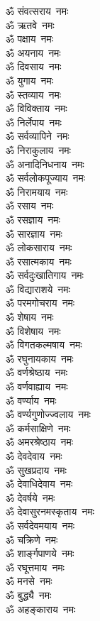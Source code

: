 \begin{multicols}{2}
\begin{flushleft}
ॐ संवत्सराय~नमः\\
ॐ ऋतवे~नमः\\
ॐ पक्षाय~नमः\\
ॐ अयनाय~नमः\\
ॐ दिवसाय~नमः\\
ॐ युगाय~नमः\\
ॐ स्तव्याय~नमः\\
ॐ विविक्ताय~नमः\\
ॐ निर्लेपाय~नमः\hfill{}\\
ॐ सर्वव्यापिने~नमः\\
ॐ निराकुलाय~नमः\\
ॐ अनादिनिधनाय~नमः\\
ॐ सर्वलोकपूज्याय~नमः\\
ॐ निरामयाय~नमः\\
ॐ रसाय~नमः\\
ॐ रसज्ञाय~नमः\\
ॐ सारज्ञाय~नमः\\
ॐ लोकसाराय~नमः\\
ॐ रसात्मकाय~नमः\hfill{}\\
ॐ सर्वदुःखातिगाय~नमः\\
ॐ विद्याराशये~नमः\\
ॐ परमगोचराय~नमः\\
ॐ शेषाय~नमः\\
ॐ विशेषाय~नमः\\
ॐ विगतकल्मषाय~नमः\\
ॐ रघुनायकाय~नमः\\
ॐ वर्णश्रेष्ठाय~नमः\\
ॐ वर्णवाह्याय~नमः\\
ॐ वर्ण्याय~नमः\hfill{}\\
ॐ वर्ण्यगुणोज्ज्वलाय~नमः\\
ॐ कर्मसाक्षिणे~नमः\\
ॐ अमरश्रेष्ठाय~नमः\\
ॐ देवदेवाय~नमः\\
ॐ सुखप्रदाय~नमः\\
ॐ देवाधिदेवाय~नमः\\
ॐ देवर्षये~नमः\\
ॐ देवासुरनमस्कृताय~नमः\\
ॐ सर्वदेवमयाय~नमः\\
ॐ चक्रिणे~नमः\hfill{}\\
ॐ शार्ङ्गपाणये~नमः\\
ॐ रघूत्तमाय~नमः\\
ॐ मनसे~नमः\\
ॐ बुद्ध्यै~नमः\\
ॐ अहङ्काराय~नमः\\

\end{flushleft}
\end{multicols}
